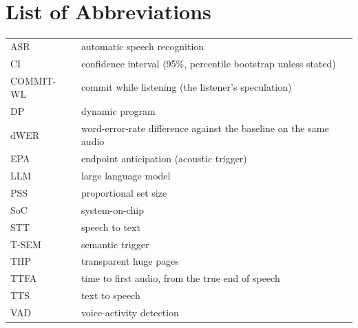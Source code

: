 \documentclass[12pt,letterpaper,oneside]{report}
\begin{document}
\renewcommand{\contentsname}{Table of Contents}
\tableofcontents
\listoffigures
\listoftables

\chapter*{List of Abbreviations}
\begin{tabular}{ll}
ASR & automatic speech recognition \\
CI & confidence interval (95\%, percentile bootstrap unless stated) \\
COMMIT-WL & commit while listening (the listener's speculation) \\
DP & dynamic program \\
dWER & word-error-rate difference against the baseline on the same audio \\
EPA & endpoint anticipation (acoustic trigger) \\
LLM & large language model \\
PSS & proportional set size \\
SoC & system-on-chip \\
STT & speech to text \\
T-SEM & semantic trigger \\
THP & transparent huge pages \\
TTFA & time to first audio, from the true end of speech \\
TTS & text to speech \\
VAD & voice-activity detection \\
\end{tabular}

\clearpage
{}














\end{document}
